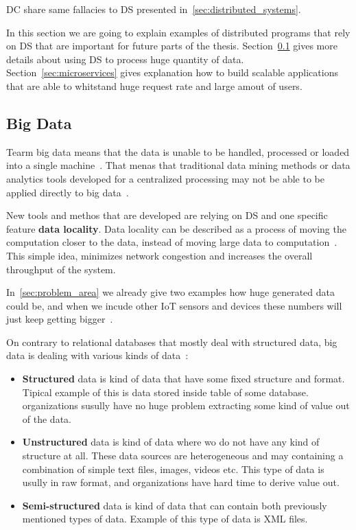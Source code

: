 DC share same fallacies to DS presented in~\ref{sec:distributed_systems}.

In this section we are going to explain examples of distributed programs that rely on DS that are important for future parts of the thesis. Section~\ref{sec:big_data} gives more details about using DS to process huge quantity of data. Section~\ref{sec:microservices} gives explanation how to build scalable applications that are able to whitstand huge request rate and large amout of users.
%
%
\subsection{Big Data}\label{sec:big_data}
%
Tearm big data means that the data is unable to be handled, processed or loaded into a single machine~\cite{FisherDCD12}. That menas that traditional data mining methods or data analytics tools developed for a centralized processing  may not be able to be applied directly to big data~\cite{Tsai2015}. 

New tools and methos that are developed are relying on DS and one specific feature \textbf{data locality}. Data locality can be described as a process of moving the computation closer to the data, instead of moving large data to computation~\cite{GuoFZ12}. This simple idea, minimizes network congestion and increases the overall throughput of the system.

In~\ref{sec:problem_area} we already give two examples how huge generated data could be, and when we incude other IoT sensors and devices these numbers will just keep getting bigger~\cite{SarigiannidisLR20}.

On contrary to relational databases that mostly deal with structured data, big data is dealing with various kinds of data~\cite{FisherDCD12, Tsai2015, GuoFZ12}:

\begin{itemize}
	\item \textbf{Structured} data is kind of data that have some fixed structure and format. Tipical example of this is data stored inside table of some database. organizations susully have no huge problem extracting some kind of value out of the data.
	\item \textbf{Unstructured} data is kind of data where wo do not have any kind of structure at all. These data sources are heterogeneous and may containing a combination of simple text files, images, videos etc. This type of data is usully in raw format, and organizations have hard time to derive value out.
	\item \textbf{Semi-structured} data is kind of data that can contain both previously mentioned types of data. Example of this type of data is XML files.
\end{itemize}

